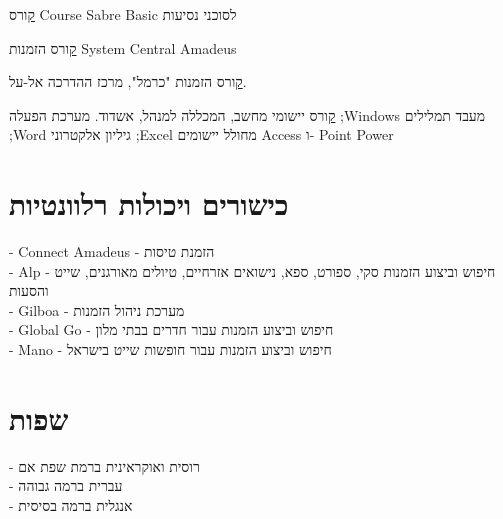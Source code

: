 {\href{https://raw.githubusercontent.com/kiril-u/k-resume-2021-1-template/main/references/basic-sabre-course.jpg}
	קורס Course Sabre Basic לסוכני נסיעות}
{}
{}

{\href{https://raw.githubusercontent.com/kiril-u/k-resume-2021-1-template/main/references/amadeus-central-system.jpg}
קורס הזמנות
System Central Amadeus
}
{}
{}

{\href{https://raw.githubusercontent.com/kiril-u/k-resume-2021-1-template/main/references/el-al-carmel.jpg}קורס הזמנות "כרמל", מרכז ההדרכה אל-על.}
{}
{}


 {
	\href{https://raw.githubusercontent.com/kiril-u/k-resume-2021-1-template/main/references/computer-programs-cert.jpg}
	קורס יישומי מחשב, המכללה למנהל, אשדוד.}
 {מערכת הפעלה ;Windows
 מעבד תמלילים ;Word
 גיליון אלקטרוני ;Excel מחולל יישומים 
 Access ו- Point Power}
{}
{}





\section{כישורים ויכולות רלוונטיות}
{- Connect Amadeus - הזמנת טיסות \\
	- Alp - חיפוש וביצוע הזמנות סקי, ספורט, ספא, נישואים אזרחיים, טיולים מאורגנים,   שייט והסעות
	\\
	- Gilboa - מערכת ניהול הזמנות \\
 	- Global Go - חיפוש וביצוע הזמנות עבור חדרים בבתי מלון \\
	- Mano - חיפוש וביצוע הזמנות עבור חופשות שייט בישראל}{}{}

\section{שפות}
{
- רוסית ואוקראינית ברמת שפת אם \\
- עברית ברמה גבוהה \\
- אנגלית ברמה בסיסית}
{}
{}



\unsetRTL